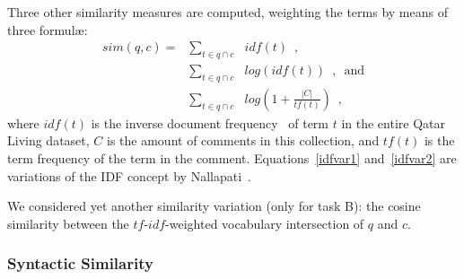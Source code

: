 Three other similarity measures are computed, weighting the terms by means of 
three 
formul\ae: 
%
\begin{align}
sim(q,c) = &
	\sum_{t\in q\cap c} & idf(t) \enspace,		\\
 	& \sum_{t\in q\cap c} & log(idf(t)) \enspace, \enspace \mathrm{and} 
\label{idfvar1}\\
 	& \sum_{t\in q\cap c} & log\left(1 + \frac{|C|}{tf(t)}\right) \enspace , \label{idfvar2}
\end{align}
% 
where $idf(t)$ is the inverse document frequency~\cite{Jones:1972} of term $t$ 
in the entire Qatar Living dataset, $C$ is the amount of comments in this collection, 
and $tf(t)$ is the term frequency of the term in the comment. 
Equations~\ref{idfvar1} and~\ref{idfvar2} are variations of the IDF concept by 
Nallapati~.

We considered yet another similarity variation (only for task B): the cosine 
similarity between the $tf$-$idf$-weighted vocabulary intersection of $q$ and 
$c$.


\subsubsection{Syntactic Similarity}
\label{sub:syntactic}

